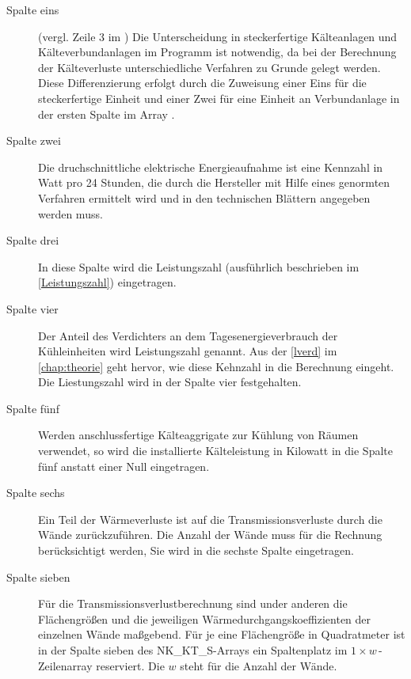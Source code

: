 \begin{description}

	\item [{Spalte eins}] (vergl. Zeile 3 im ) Die Unterscheidung in
	steckerfertige Kälteanlagen und Kälteverbundanlagen im Programm ist notwendig, da bei der Berechnung der
	Kälteverluste unterschiedliche Verfahren zu Grunde gelegt werden.  Diese
	Differenzierung erfolgt durch die Zuweisung einer Eins für die steckerfertige Einheit und einer Zwei für eine Einheit
	an Verbundanlage in der ersten Spalte im Array .

	\item [{Spalte zwei}] Die druchschnittliche elektrische Energieaufnahme ist eine Kennzahl in Watt pro 24 Stunden, die
	durch die Hersteller mit Hilfe eines genormten Verfahren ermittelt wird und in den technischen Blättern angegeben
	werden muss.

	\item [{Spalte drei}] In diese Spalte wird die Leistungszahl (ausführlich beschrieben im \cref{Leistungszahl})
	eingetragen.

	\item [{Spalte vier}] Der Anteil des Verdichters an dem Tagesenergieverbrauch der Kühleinheiten wird Leistungszahl
	genannt. Aus der \cref{lverd} im \cref{chap:theorie} geht hervor, wie diese Kehnzahl in die Berechnung eingeht. Die
	Liestungszahl wird in der Spalte vier festgehalten.

	\item [{Spalte fünf}] Werden anschlussfertige Kälteaggrigate zur Kühlung von Räumen verwendet, so wird die
	installierte Kälteleistung in Kilowatt in die Spalte fünf anstatt einer Null eingetragen.

	\item [{Spalte sechs}] Ein Teil der Wärmeverluste ist auf die Transmissionsverluste durch die Wände zurückzuführen.
	Die Anzahl der Wände muss für die Rechnung berücksichtigt werden, Sie wird in die sechste Spalte eingetragen.
	
	\item [{Spalte sieben}] Für die Transmissionsverlustberechnung sind under anderen die Flächengrößen und die jeweiligen
	Wärmedurchgangskoeffizienten der einzelnen Wände maßgebend. Für je eine Flächengröße in Quadratmeter ist in
	der Spalte sieben des NK\_KT\_S-Arrays ein Spaltenplatz im $1\times w\,$-Zeilenarray reserviert. Die $w$ steht für die
	Anzahl der Wände.


\end{description}
